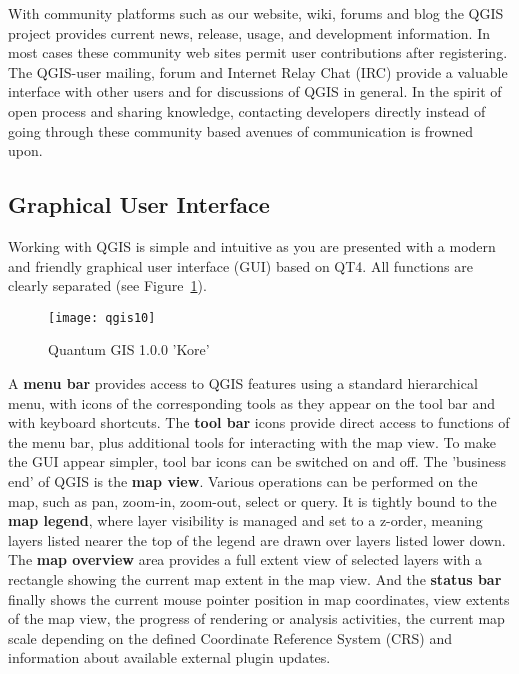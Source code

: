 With community platforms such as our website, wiki, forums and blog the QGIS project
provides current news, release, usage, and development information. In most cases 
these community web sites permit user contributions after registering. 
The QGIS-user mailing, forum and Internet Relay Chat (IRC) provide a valuable interface 
with other users and for discussions of QGIS in general. In the spirit of open 
process and sharing knowledge, contacting developers directly instead of going through 
these community based avenues of communication is frowned upon.

\subsection{Graphical User Interface}

Working with QGIS is simple and intuitive as you are presented with a
modern and friendly graphical user interface (GUI) based on QT4. All
functions are clearly separated (see Figure~\ref{fig:qgis10}).

\begin{figure}[h]
   \begin{center}
   \caption{Quantum GIS 1.0.0 'Kore'}\label{fig:qgis10}\smallskip
   \texttt{[image: qgis10]}
\end{center}
\end{figure}

A \textbf{menu bar} provides access to QGIS features using a standard
hierarchical menu, with icons of the corresponding tools as they appear on
the tool bar and with keyboard shortcuts. The \textbf{tool bar} icons provide
direct access to functions of the menu bar, plus additional tools for
interacting with the map view. To make the GUI appear simpler, tool bar icons
can be switched on and off. The 'business end' of QGIS is the \textbf{map
view}. Various operations can be performed on the map, such as pan, zoom-in,
zoom-out, select or query. It is tightly bound to the \textbf{map legend},
where layer visibility is managed and set to a z-order, meaning layers
listed nearer the top of the legend are drawn over layers listed lower down.
The \textbf{map overview} area provides a full extent view of selected layers
with a rectangle showing the current map extent in the map view. And the
\textbf{status bar} finally shows the current mouse pointer position in map
coordinates, view extents of the map view, the progress of rendering or
analysis activities, the current map scale depending on the defined
Coordinate Reference System (CRS) and information about available external
plugin updates.

